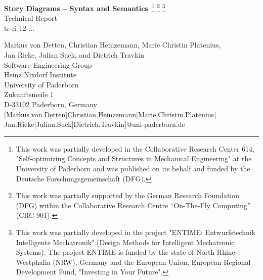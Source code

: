 \documentclass[12pt,a4paper,twoside,titlepage,openright,headsepline,listof=totoc,index=totoc,chapterprefix,bibliography=totoc]{scrreprt}
\theoremstyle{break}
\begin{document}


	\setcounter{page}{1}

	\begin{titlepage}
	\thispagestyle{empty}
	{\center

			\vspace{1.5cm}
            {\LARGE  {\bf Story Diagrams -- Syntax and Semantics}\,
             \footnote{This work was partially developed in the Collaborative Research Center %
             614, "Self-optimizing Concepts and Structures in Mechanical Engineering" at the University of Paderborn
             and was published on its behalf and funded by the Deutsche Forschungsgemeinschaft (DFG).}
             \footnote{This work was partially supported by the German Research Foundation (DFG) within the 
             Collaborative Research Centre ``On-The-Fly Computing'' (CRC 901).}
             \footnote{This work was partially developed in the project "ENTIME: Entwurfstechnik Intelligente Mechatronik" (Design Methods for Intelligent Mechatronic Systems).
             The project ENTIME is funded by the state of North Rhine-Westphalia (NRW), Germany and the European Union, European Regional Development Fund, "Investing in Your Future".}}
			\\
			\vspace{1.5cm}
			{\Large Technical Report} \\[0.2cm]
			{\large tr-ri-12-...} \\
			\vspace{1cm}
			 
			
			Markus von Detten, Christian Heinzemann, Marie Christin Platenius, \\
			Jan Rieke, Julian Suck, and Dietrich Travkin \\
			Software Engineering Group\\			
			Heinz Nixdorf Institute\\
			University of Paderborn\\
			Zukunftsmeile 1\\
			D-33102 Paderborn, Germany\\
			$[$Markus.von.Detten|Christian.Heinzemann|Marie.Christin.Platenius|\\
			Jan.Rieke|Julian.Suck|Dietrich.Travkin$]$@uni-paderborn.de\\

}
\end{titlepage}
\end{document}
